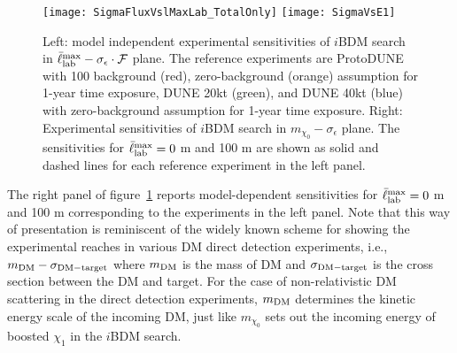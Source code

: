 \begin{figure}[t]
\centering
\texttt{[image: SigmaFluxVslMaxLab\_TotalOnly]}
\texttt{[image: SigmaVsE1]}
\caption{
Left: model independent experimental sensitivities of $i$BDM search in $\bar{\ell}_{\rm lab}^{\rm max} - \sigma_\epsilon \cdot \mathcal F$ plane. 
The reference experiments are ProtoDUNE with 100 background (red), zero-background (orange) assumption for 1-year time exposure, DUNE 20kt (green), and DUNE 40kt (blue) with zero-background assumption for 1-year time exposure. 
Right: Experimental sensitivities of $i$BDM search in $m_{\chi_0} - \sigma_\epsilon$ plane. The sensitivities for $\bar{\ell}_{\rm lab}^{\rm max} = 0$ m and 100 m are shown as solid and dashed lines for each reference experiment in the left panel.
\label{fig:modelindependent} }
\end{figure}

The right panel of figure~\ref{fig:modelindependent} reports model-dependent sensitivities for $\bar{\ell}_{\rm lab}^{\rm max} = 0$ m and 100 m corresponding to the experiments in the left panel.
Note that this way of presentation is reminiscent of the widely known scheme for showing the experimental reaches in various DM direct detection experiments, i.e., $m_{\rm DM} - \sigma_{\rm DM - target}$ where $m_{\rm DM}$ is the mass of DM and $\sigma_{\rm DM - target}$ is the cross section between the DM and target. 
For the case of non-relativistic DM scattering in the direct detection experiments, $m_{\rm DM}$ determines the kinetic energy scale of the incoming DM, just like $m_{\chi_0}$ sets out the incoming energy of boosted $\chi_1$ in the $i$BDM search. 
